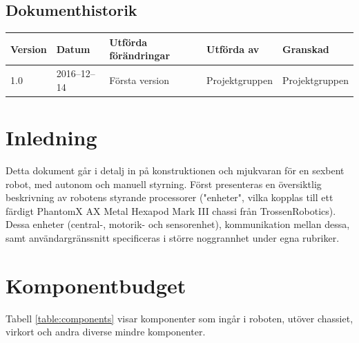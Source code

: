 \documentclass[a4paper,titlepage,12pt]{article}
\begin{document}
\begin{center}

		\section*{Dokumenthistorik}
		\renewcommand*{\arraystretch}{1.4}
        \begin{longtable}[c]{ l l >{\raggedright}p{5cm} >{\raggedright}p{3cm} l }
			\textbf{Version} & \textbf{Datum} & \textbf{Utförda förändringar} 
			& \textbf{Utförda av} & \textbf{Granskad} \\ \midrule
			
			1.0 & 2016--12--14 & Första version & Projektgruppen &
            Projektgruppen \\
            
		\end{longtable}
	\end{center}


	\newpage

	\raggedright

	\setcounter{table}{0}

	\section{Inledning}
	Detta dokument går i detalj in på konstruktionen och mjukvaran för en 
	sexbent robot, med autonom och manuell styrning. Först presenteras en 
	översiktlig beskrivning av robotens styrande processorer ("enheter", vilka kopplas till ett färdigt 
	PhantomX AX Metal Hexapod Mark III chassi från TrossenRobotics). Dessa enheter (central-, 
	motorik- och sensorenhet), kommunikation mellan dessa, samt användargränssnitt specificeras 
	i större noggrannhet under egna rubriker.
	
	\section{Komponentbudget}
	
	Tabell \ref{table:components} visar komponenter som ingår i
	roboten, utöver chassiet, virkort och andra diverse
	mindre komponenter.
	
\end{document}
